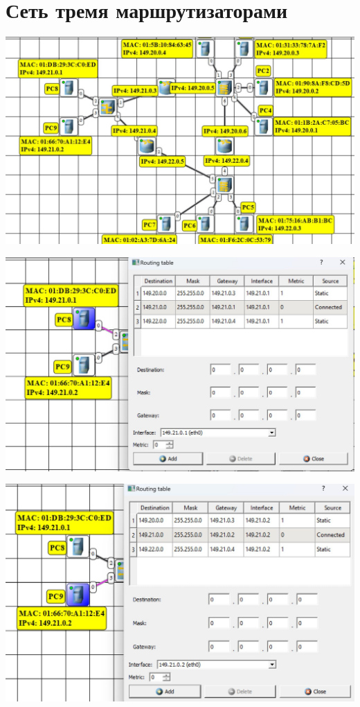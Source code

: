 \documentclass{article}
\begin{document}
\section*{Сеть тремя маршрутизаторами}
\begin{center}
    \includegraphics[width=.9\textwidth]{2-8}
\end{center}
\begin{center}
    \includegraphics[width=.9\textwidth]{3-0}
\end{center}
\begin{center}
    \includegraphics[width=.9\textwidth]{3-1}
\end{center}
\end{document}
